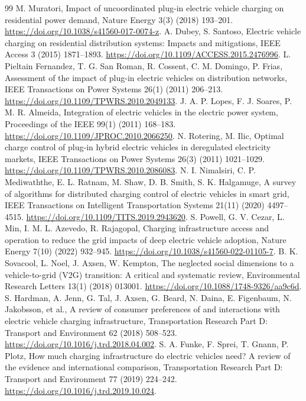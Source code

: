 \documentclass[12pt]{article}
\begin{document}
\begin{thebibliography}{99}
 M. Muratori, Impact of uncoordinated plug-in electric vehicle charging on residential power demand, Nature Energy 3(3) (2018) 193--201. \url{https://doi.org/10.1038/s41560-017-0074-z}.
 A. Dubey, S. Santoso, Electric vehicle charging on residential distribution systems: Impacts and mitigations, IEEE Access 3 (2015) 1871--1893. \url{https://doi.org/10.1109/ACCESS.2015.2476996}.
 L. Pieltain Fernandez, T. G. San Roman, R. Cossent, C. M. Domingo, P. Frias, Assessment of the impact of plug-in electric vehicles on distribution networks, IEEE Transactions on Power Systems 26(1) (2011) 206--213. \url{https://doi.org/10.1109/TPWRS.2010.2049133}.
 J. A. P. Lopes, F. J. Soares, P. M. R. Almeida, Integration of electric vehicles in the electric power system, Proceedings of the IEEE 99(1) (2011) 168--183. \url{https://doi.org/10.1109/JPROC.2010.2066250}.
 N. Rotering, M. Ilic, Optimal charge control of plug-in hybrid electric vehicles in deregulated electricity markets, IEEE Transactions on Power Systems 26(3) (2011) 1021--1029. \url{https://doi.org/10.1109/TPWRS.2010.2086083}.
 N. I. Nimalsiri, C. P. Mediwaththe, E. L. Ratnam, M. Shaw, D. B. Smith, S. K. Halgamuge, A survey of algorithms for distributed charging control of electric vehicles in smart grid, IEEE Transactions on Intelligent Transportation Systems 21(11) (2020) 4497--4515. \url{https://doi.org/10.1109/TITS.2019.2943620}.
 S. Powell, G. V. Cezar, L. Min, I. M. L. Azevedo, R. Rajagopal, Charging infrastructure access and operation to reduce the grid impacts of deep electric vehicle adoption, Nature Energy 7(10) (2022) 932--945. \url{https://doi.org/10.1038/s41560-022-01105-7}.
 B. K. Sovacool, L. Noel, J. Axsen, W. Kempton, The neglected social dimensions to a vehicle-to-grid (V2G) transition: A critical and systematic review, Environmental Research Letters 13(1) (2018) 013001. \url{https://doi.org/10.1088/1748-9326/aa9c6d}.
 S. Hardman, A. Jenn, G. Tal, J. Axsen, G. Beard, N. Daina, E. Figenbaum, N. Jakobsson, et al., A review of consumer preferences of and interactions with electric vehicle charging infrastructure, Transportation Research Part D: Transport and Environment 62 (2018) 508--523. \url{https://doi.org/10.1016/j.trd.2018.04.002}.
 S. A. Funke, F. Sprei, T. Gnann, P. Plotz, How much charging infrastructure do electric vehicles need? A review of the evidence and international comparison, Transportation Research Part D: Transport and Environment 77 (2019) 224--242. \url{https://doi.org/10.1016/j.trd.2019.10.024}.

\end{thebibliography}
\end{document}
